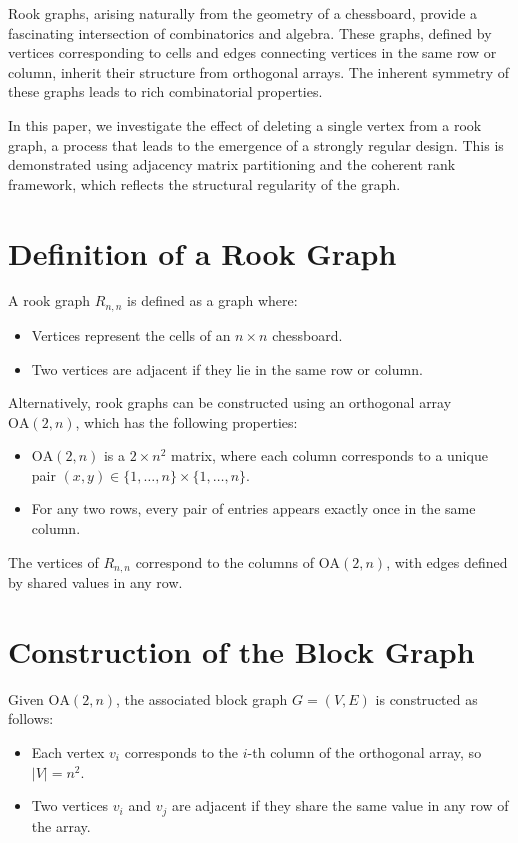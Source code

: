\documentclass{article}
\begin{document}
Rook graphs, arising naturally from the geometry of a chessboard, provide a fascinating intersection of combinatorics and algebra. These graphs, defined by vertices corresponding to cells and edges connecting vertices in the same row or column, inherit their structure from orthogonal arrays. The inherent symmetry of these graphs leads to rich combinatorial properties.

In this paper, we investigate the effect of deleting a single vertex from a rook graph, a process that leads to the emergence of a strongly regular design. This is demonstrated using adjacency matrix partitioning and the coherent rank framework, which reflects the structural regularity of the graph.

\section{Definition of a Rook Graph}

A rook graph \( R_{n,n} \) is defined as a graph where:
\begin{itemize}
    \item Vertices represent the cells of an \( n \times n \) chessboard.
    \item Two vertices are adjacent if they lie in the same row or column.
\end{itemize}

Alternatively, rook graphs can be constructed using an orthogonal array \( \text{OA}(2, n) \), which has the following properties:
\begin{itemize}
    \item \( \text{OA}(2, n) \) is a \( 2 \times n^2 \) matrix, where each column corresponds to a unique pair \( (x, y) \in \{1, \dots, n\} \times \{1, \dots, n\} \).
    \item For any two rows, every pair of entries appears exactly once in the same column.
\end{itemize}

The vertices of \( R_{n,n} \) correspond to the columns of \( \text{OA}(2, n) \), with edges defined by shared values in any row.

\section{Construction of the Block Graph}

Given \( \text{OA}(2, n) \), the associated block graph \( G = (V, E) \) is constructed as follows:
\begin{itemize}
    \item Each vertex \( v_i \) corresponds to the \( i \)-th column of the orthogonal array, so \( |V| = n^2 \).
    \item Two vertices \( v_i \) and \( v_j \) are adjacent if they share the same value in any row of the array.
\end{itemize}
\end{document}
